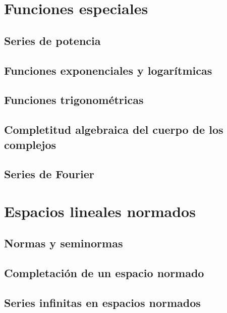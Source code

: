 \documentclass[12pt,]{krantz}
\theoremstyle{definition}
\theoremstyle{definition}
\theoremstyle{definition}
\theoremstyle{remark}
\begin{document}
\chapter{Funciones especiales}\label{funciones-especiales}

\section{Series de potencia}\label{series-de-potencia}

\section{Funciones exponenciales y
logarítmicas}\label{funciones-exponenciales-y-logaritmicas}

\section{Funciones trigonométricas}\label{funciones-trigonometricas}

\section{Completitud algebraica del cuerpo de los
complejos}\label{completitud-algebraica-del-cuerpo-de-los-complejos}

\section{Series de Fourier}\label{series-de-fourier}

\chapter{Espacios lineales normados}\label{espacios-lineales-normados}

\section{Normas y seminormas}\label{normas-y-seminormas}

\section{Completación de un espacio
normado}\label{completacion-de-un-espacio-normado}

\section{Series infinitas en espacios
normados}\label{series-infinitas-en-espacios-normados}
\end{document}
